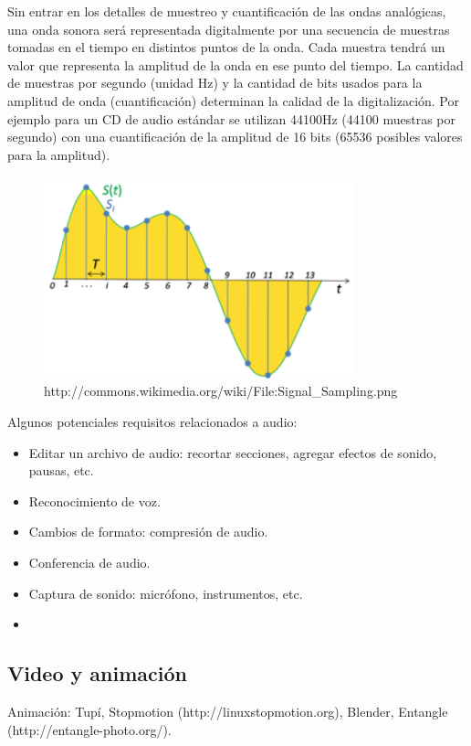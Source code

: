 \documentclass[12pt]{article}
\begin{document}
Sin entrar en los detalles de muestreo y cuantificación de las ondas analógicas, 
una onda sonora será representada digitalmente por una secuencia 
de muestras tomadas en el tiempo en distintos puntos de la onda. Cada muestra 
tendrá un valor que representa la amplitud de la onda en ese punto del tiempo.
La cantidad de muestras por segundo (unidad Hz) y la cantidad de bits usados 
para la amplitud de onda (cuantificación) determinan la calidad de la 
digitalización. Por ejemplo para un CD de audio estándar se utilizan 44100Hz
(44100 muestras por segundo) con una cuantificación de la amplitud de 16 bits
(65536 posibles valores para la amplitud). 


\begin{figure}[h]
\centering
\includegraphics[width=0.8\textwidth]{Sampling.png}
\renewcommand{\figurename}{Fig.}
\caption{http://commons.wikimedia.org/wiki/File:Signal\_Sampling.png}
\label{contexto:figura}
\end{figure}


Algunos potenciales requisitos relacionados a audio:
\begin{itemize}
\item Editar un archivo de audio: recortar secciones, 
agregar efectos de sonido, pausas, etc. 
\item Reconocimiento de voz. 
\item Cambios de formato: compresión de audio. 
\item Conferencia de audio. 
\item Captura de sonido: micrófono, instrumentos, etc. 
\item 
\end{itemize}

\subsection*{Video y animación}
Animación: Tupí, Stopmotion (http://linuxstopmotion.org), Blender, 
Entangle (http://entangle-photo.org/).
\end{document}
